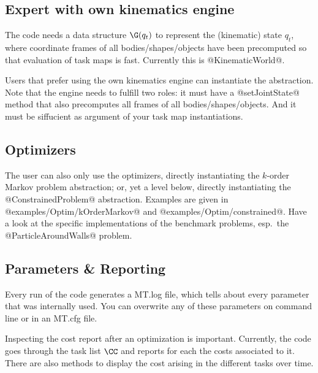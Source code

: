 \documentclass[10pt,fleqn,twoside]{article}
\begin{document}
\subsection{Expert with own kinematics engine}

The code needs a data structure $\G(q_t)$ to represent the
(kinematic) state $q_t$, where coordinate frames of all
bodies/shapes/objects have been precomputed so that evaluation of task
maps is fast. Currently this is @KinematicWorld@.

Users that prefer using the own kinematics engine can instantiate the
abstraction. Note that the engine needs to fulfill two roles: it must
have a @setJointState@ method that also precomputes all frames of all
bodies/shapes/objects. And it must be siffucient as argument of your
task map instantiations.

\subsection{Optimizers}

The user can also only use the optimizers, directly instantiating the
$k$-order Markov problem abstraction; or, yet a level below, directly
instantiating the @ConstrainedProblem@ abstraction. Examples are given
in @examples/Optim/kOrderMarkov@ and
@examples/Optim/constrained@. Have a look at the specific
implementations of the benchmark problems, esp.\ the
@ParticleAroundWalls@ problem.

\subsection{Parameters \& Reporting}

Every run of the code generates a MT.log file, which tells about every
parameter that was internally used. You can overwrite any of these
parameters on command line or in an MT.cfg file.

Inspecting the cost report after an optimization is
important. Currently, the code goes through the task list $\CC$ and
reports for each the costs associated to it. There are also methods to
display the cost arising in the different tasks over time.



\end{document}
